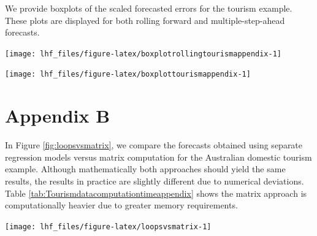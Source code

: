 \documentclass[11pt,a4paper,]{article}
\let\origfigure\figure
\let\endorigfigure\endfigure
\renewenvironment{figure}[1][2] {
    \expandafter\origfigure\expandafter[!htbp]
} {
    \endorigfigure
}
\begin{document}
We provide boxplots of the scaled forecasted errors for the tourism
example. These plots are displayed for both rolling forward and
multiple-step-ahead forecasts.

\begin{figure}

{\centering \texttt{[image: lhf\_files/figure-latex/boxplotrollingtourismappendix-1]} 

}

\caption{Box plots of scaled forecast errors from reconciled and unreconciled ETS, ARIMA and OLS methods at each hierarchical level for rolling origin 24-step-ahead tourism demand.}\label{fig:boxplotrollingtourismappendix}
\end{figure}

\begin{figure}

{\centering \texttt{[image: lhf\_files/figure-latex/boxplottourismappendix-1]} 

}

\caption{Box plots of scaled forecast errors from reconciled and unreconciled ETS, ARIMA and OLS methods at each hierarchical level for fixed origin 24-step-ahead tourism demand.}\label{fig:boxplottourismappendix}
\end{figure}

\clearpage

\clearpage

\hypertarget{appendixB}{%
\section*{Appendix B}\label{appendixB}}

In Figure \ref{fig:loopsvsmatrix}, we compare the forecasts obtained
using separate regression models versus matrix computation for the
Australian domestic tourism example. Although mathematically both
approaches should yield the same results, the results in practice are
slightly different due to numerical deviations. Table
\ref{tab:Tourismdatacomputationtimeappendix} shows the matrix approach
is computationally heavier due to greater memory requirements.

\begin{figure}

{\centering \texttt{[image: lhf\_files/figure-latex/loopsvsmatrix-1]} 

}

\caption{Comparison of the forecasts obtained  using a matrix approach and separate regression models to reconcile forecasts for rolling and fixed origin 24-step-ahead tourism demand (bottom level series only).}\label{fig:loopsvsmatrix}
\end{figure}
\end{document}
